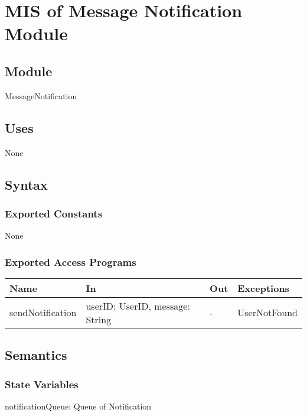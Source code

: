 \documentclass[12pt, titlepage]{article}
\begin{document}
\newpage
\section{MIS of Message Notification Module} \label{MessageNotificationModule}

\subsection{Module}

MessageNotification

\subsection{Uses}

None

\subsection{Syntax}

\subsubsection{Exported Constants}

None

\subsubsection{Exported Access Programs}

\begin{center}
\begin{tabular}{p{3cm} p{5cm} p{2cm} p{2.5cm}}
\hline
\textbf{Name} & \textbf{In} & \textbf{Out} & \textbf{Exceptions} \\
\hline
sendNotification & userID: UserID, message: String & - & UserNotFound \\
\hline
\end{tabular}
\end{center}

\subsection{Semantics}

\subsubsection{State Variables}

notificationQueue: Queue of Notification
\end{document}
